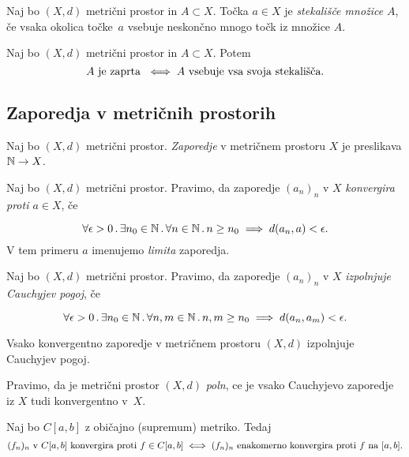 \begin{definicija}
    Naj bo $(X, d)$ metrični prostor in $A \subset X$. Točka $a \in X$ je \emph{stekališče množice} $A$, če vsaka okolica točke~$a$ vsebuje neskončno mnogo točk iz množice $A$.
\end{definicija}

\begin{trditev}
    Naj bo $(X, d)$ metrični prostor in $A \subset X$. Potem 
    $$A \text{ je zaprta } \iff A \text{ vsebuje vsa svoja stekališča}.$$
\end{trditev}

\newpage
\subsection*{Zaporedja v metričnih prostorih}
\begin{definicija}
    Naj bo $(X, d)$ metrični prostor. \emph{Zaporedje} v metričnem prostoru $X$ je preslikava $\mathbb{N} \to X$.
\end{definicija}

\begin{definicija}
    Naj bo $(X, d)$ metrični prostor. Pravimo, da zaporedje $(a_n)_n$ v $X$ \emph{konvergira proti $a \in X$}, če

    $$\forall \epsilon > 0 \,.\, \exists n_0 \in \mathbb{N} \,.\, \forall n \in \mathbb{N} \,.\, n \geq n_0 \implies d(a_n, a) < \epsilon.$$
    V tem primeru $a$ imenujemo \emph{limita} zaporedja.
\end{definicija}

\begin{definicija}
    Naj bo $(X, d)$ metrični prostor. Pravimo, da zaporedje $(a_n)_n$ v $X$ \emph{izpolnjuje Cauchyjev pogoj}, če

    $$\forall \epsilon > 0 \,.\, \exists n_0 \in \mathbb{N} \,.\, \forall n, m \in \mathbb{N} \,.\, n, m \geq n_0 \implies d(a_n, a_m) < \epsilon.$$
\end{definicija}

\begin{izrek}
    Vsako konvergentno zaporedje v metričnem prostoru $(X, d)$ izpolnjuje Cauchyjev pogoj.
\end{izrek}

\begin{definicija}
    Pravimo, da je metrični prostor $(X, d)$ \emph{poln}, ce je vsako Cauchyjevo zaporedje iz $X$ tudi konvergentno v~$X$.
\end{definicija}

\begin{izrek}
    Naj bo $C[a,b]$ z običajno (supremum) metriko. Tedaj 
    $$(f_n)_n \text{ v } C[a,b] \text{ konvergira proti } f \in C[a,b] \iff (f_n)_n \text{ enakomerno konvergira proti } f \text{ na } [a, b].$$
\end{izrek}

